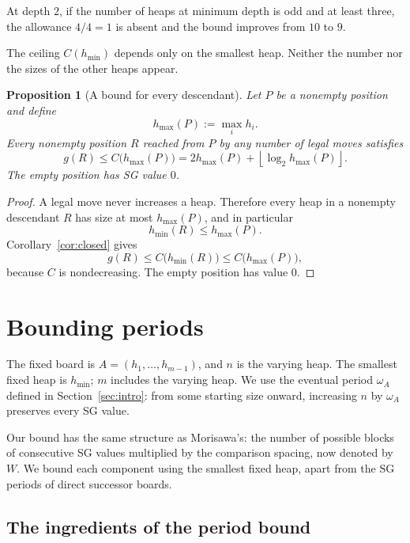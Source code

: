 \documentclass[11pt]{article}
\newtheorem{proposition}[theorem]{Proposition}
\begin{document}
At depth $2$, if the number of heaps at minimum depth is odd
and at least three, the allowance $4/4=1$ is absent and the
bound improves from $10$ to $9$.

The ceiling $C(h_{\min})$ depends only on the smallest heap.
Neither the number nor the sizes of the other heaps appear.

\begin{proposition}[A bound for every descendant]
\label{prop:descendantbound}
Let $P$ be a nonempty position and define
\[
 h_{\max}(P):=\max_i h_i.
\]
Every nonempty position $R$ reached from $P$ by any number of
legal moves satisfies
\begin{equation}
 \boxed{
 g(R)\le C\bigl(h_{\max}(P)\bigr)
 =
 2h_{\max}(P)
 +\left\lfloor\log_2 h_{\max}(P)\right\rfloor.
 }
 \label{eq:descendantbound}
\end{equation}
The empty position has SG value $0$.
\end{proposition}

\begin{proof}
A legal move never increases a heap. Therefore every heap in a
nonempty descendant $R$ has size at most $h_{\max}(P)$, and in
particular
\[
 h_{\min}(R)\le h_{\max}(P).
\]
Corollary~\ref{cor:closed} gives
\[
 g(R)\le C\bigl(h_{\min}(R)\bigr)
 \le C\bigl(h_{\max}(P)\bigr),
\]
because $C$ is nondecreasing. The empty position has value $0$.
\end{proof}


\section{Bounding periods}
\label{sec:periods}

The fixed board is $A=(h_1,\ldots,h_{m-1})$, and $n$ is the
varying heap. The smallest fixed heap is $h_{\min}$; $m$ includes
the varying heap. We use the eventual period $\omega_A$ defined
in Section~\ref{sec:intro}: from some starting size onward,
increasing $n$ by $\omega_A$ preserves every SG value.

Our bound has the same structure as Morisawa's: the number of
possible blocks of consecutive SG values multiplied by the
comparison spacing, now denoted by $W$. We bound each component
using the smallest fixed heap, apart from the SG periods of
direct successor boards.

\subsection{The ingredients of the period bound}
\end{document}
